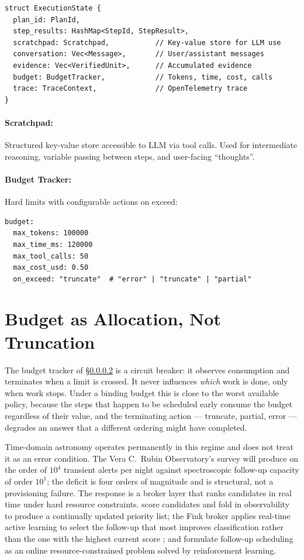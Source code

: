 \begin{verbatim}
struct ExecutionState {
  plan_id: PlanId,
  step_results: HashMap<StepId, StepResult>,
  scratchpad: Scratchpad,           // Key-value store for LLM use
  conversation: Vec<Message>,       // User/assistant messages
  evidence: Vec<VerifiedUnit>,      // Accumulated evidence
  budget: BudgetTracker,            // Tokens, time, cost, calls
  trace: TraceContext,              // OpenTelemetry trace
}
\end{verbatim}

\paragraph{Scratchpad:} Structured key-value store accessible to LLM via tool calls. Used for intermediate reasoning, variable passing between steps, and user-facing ``thoughts''.

\paragraph{Budget Tracker:}
\label{sec:runtime:budget}
Hard limits with configurable actions on exceed:
\begin{verbatim}
budget:
  max_tokens: 100000
  max_time_ms: 120000
  max_tool_calls: 50
  max_cost_usd: 0.50
  on_exceed: "truncate"  # "error" | "truncate" | "partial"
\end{verbatim}

\section{Budget as Allocation, Not Truncation}
\label{sec:runtime:allocation}

The budget tracker of \S\ref{sec:runtime:budget} is a circuit breaker: it observes consumption and terminates when a limit is crossed. It never influences \emph{which} work is done, only when work stops. Under a binding budget this is close to the worst available policy, because the steps that happen to be scheduled early consume the budget regardless of their value, and the terminating action --- truncate, partial, error --- degrades an answer that a different ordering might have completed.

Time-domain astronomy operates permanently in this regime and does not treat it as an error condition. The Vera C.\ Rubin Observatory's survey will produce on the order of $10^4$ transient alerts per night against spectroscopic follow-up capacity of order $10^1$; the deficit is four orders of magnitude and is structural, not a provisioning failure. The response is a broker layer that ranks candidates in real time under hard resource constraints. \citet{aas2rto2025} score candidates and fold in observability to produce a continually updated priority list; the Fink broker applies real-time active learning to select the follow-up that most improves classification rather than the one with the highest current score \citep{fink2025active}; and \citet{rlfollowup2025} formulate follow-up scheduling as an online resource-constrained problem solved by reinforcement learning.

